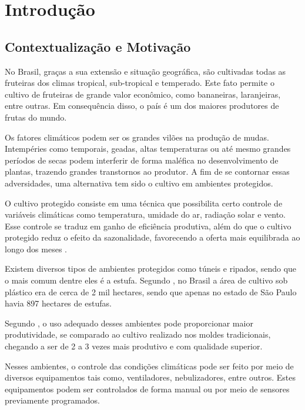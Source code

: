 \chapter{Introdução}

\section{Contextualização e Motivação}
No Brasil, graças a sua extensão e situação geográfica, são cultivadas todas as fruteiras dos climas tropical, sub-tropical e temperado. Este fato permite o cultivo de fruteiras de grande valor econômico, como bananeiras, laranjeiras, entre outras. Em consequência disso, o país é um dos maiores produtores de frutas do mundo.

Os fatores climáticos podem ser os grandes vilões na produção de mudas. Intempéries como temporais, geadas, altas temperaturas ou até mesmo grandes períodos de secas podem interferir de forma maléfica no desenvolvimento de plantas, trazendo grandes transtornos ao produtor. A fim de se contornar essas adversidades, uma alternativa  tem sido o cultivo em ambientes protegidos.

\begin{citacao}
O cultivo protegido consiste em uma técnica que possibilita certo controle de variáveis climáticas como temperatura, umidade do ar, radiação solar e vento. Esse controle se traduz em ganho de eficiência produtiva, além do que o cultivo protegido reduz o efeito da sazonalidade, favorecendo a oferta mais equilibrada ao longo dos meses \cite{silva2014cultivoprotegido}.	
\end{citacao}

Existem diversos tipos de ambientes protegidos como túneis e ripados, sendo que o mais comum dentre eles é a estufa. Segundo 
, no Brasil a área de cultivo sob plástico era de cerca de 2 mil hectares, sendo que apenas no estado de São Paulo havia 897 hectares de estufas. 

Segundo , o uso adequado desses ambientes pode proporcionar maior produtividade, se comparado ao cultivo realizado nos moldes tradicionais, chegando a ser de 2 a 3 vezes mais produtivo e com qualidade superior.

Nesses ambientes, o controle das condições climáticas pode ser feito por meio de diversos equipamentos tais como, ventiladores, nebulizadores, entre outros. Estes equipamentos podem ser controlados de forma manual ou por meio de sensores previamente programados.

